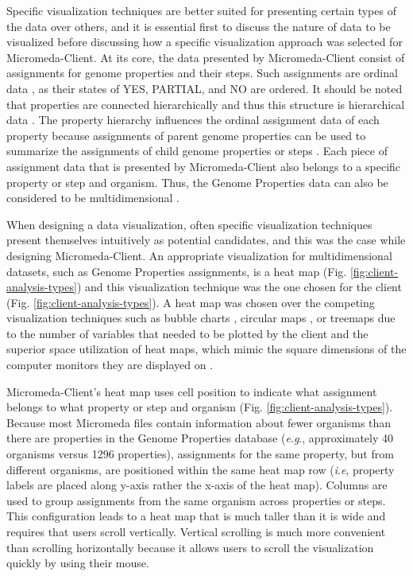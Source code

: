 Specific visualization techniques are better suited for presenting certain types 
of the data over others, and it is essential first to discuss the nature of data to 
be visualized before discussing how a specific visualization approach was 
selected for Micromeda-Client. At its core, the data presented by 
Micromeda-Client consist of assignments for genome properties and their steps. 
Such assignments are ordinal data 
\cite{richardson2018genome,agresti2010analysis}, as their states of YES, 
PARTIAL, and NO are ordered. It should be noted that properties are connected 
hierarchically \cite{richardson2018genome} and thus this structure is 
hierarchical data \cite{richardson2018genome,samet1990applications}. The 
property hierarchy influences the ordinal assignment data of each property 
because assignments of parent genome properties can be used to summarize the 
assignments of child genome properties or steps \cite{richardson2018genome}. 
Each piece of assignment data that is presented by Micromeda-Client also belongs 
to a specific property or step and organism. Thus, the Genome Properties data 
can also be considered to be multidimensional 
\cite{pedersen1999multidimensional}.

When designing a data visualization, often specific visualization techniques 
present themselves intuitively as potential candidates, and this was the case 
while designing Micromeda-Client. An appropriate visualization for 
multidimensional datasets, such as Genome Properties assignments, is a heat map 
\cite{wilkinson2009history,tufte2001visual}(Fig. 
\ref{fig:client-analysis-types}) and this visualization technique was the one 
chosen for the client (Fig. \ref{fig:client-analysis-types}). A heat map was 
chosen over the competing visualization techniques such as bubble charts 
\cite{tufte2001visual}, circular maps 
\cite{ward2002taxonomy,stothard2004circular}, or treemaps 
\cite{shneiderman1998tree} due to the number of variables that needed to be 
plotted by the client and the superior space utilization of heat maps, which 
mimic the square dimensions of the computer monitors they are displayed on 
\cite{muramalla2017radial}.

Micromeda-Client's heat map uses cell position to indicate what assignment 
belongs to what property or step and organism (Fig. 
\ref{fig:client-analysis-types}). Because most Micromeda files contain 
information about fewer organisms than there are properties in the Genome 
Properties database (\textit{e}.\textit{g}., approximately 40 organisms versus 
1296 properties), assignments for the same property, but from different 
organisms, are positioned within the same heat map row (\textit{i}.\textit{e}, 
property labels are placed along y-axis rather the x-axis of the heat map). 
Columns are used to group assignments from the same organism across properties 
or steps. This configuration leads to a heat map that is much taller than it is 
wide and requires that users scroll vertically. Vertical scrolling is much more 
convenient than scrolling horizontally because it allows users to scroll the 
visualization quickly by using their mouse.


